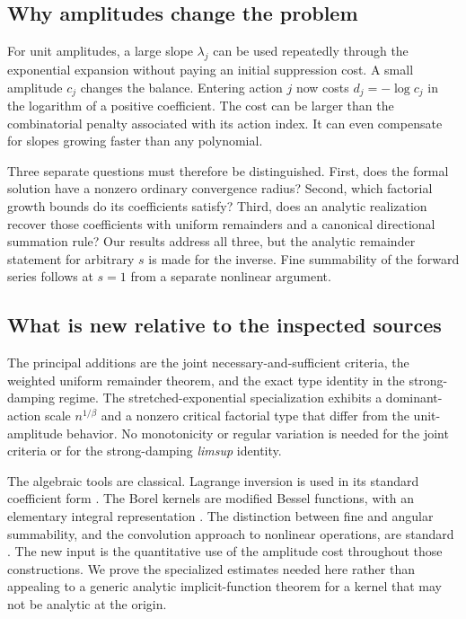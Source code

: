 \documentclass[11pt,a4paper]{article}
\numberwithin{equation}{section}
\theoremstyle{definition}
\theoremstyle{remark}
\theoremstyle{definition}
\begin{document}
\subsection{Why amplitudes change the problem}
For unit amplitudes, a large slope $\lambda_j$ can be used repeatedly
through the exponential expansion without paying an initial suppression
cost. A small amplitude $c_j$ changes the balance. Entering action $j$
now costs $d_j=-\log c_j$ in the logarithm of a positive coefficient.
The cost can be larger than the combinatorial penalty associated with
its action index. It can even compensate for slopes growing faster than
any polynomial.

Three separate questions must therefore be distinguished. First, does the
formal solution have a nonzero ordinary convergence radius? Second, which
factorial growth bounds do its coefficients satisfy? Third, does an
analytic realization recover those coefficients with uniform remainders
and a canonical directional summation rule? Our results address all
three, but the analytic remainder statement for arbitrary $s$ is made
for the inverse. Fine summability of the forward series follows at
$s=1$ from a separate nonlinear argument.

\subsection{What is new relative to the inspected sources}
The principal additions are the joint necessary-and-sufficient criteria,
the weighted uniform remainder theorem, and the exact type identity in
the strong-damping regime. The stretched-exponential specialization
exhibits a dominant-action scale $n^{1/\beta}$ and a nonzero critical
factorial type that differ from the unit-amplitude behavior. No
monotonicity or regular variation is needed for the joint criteria or
for the strong-damping \emph{limsup} identity.

The algebraic tools are classical. Lagrange inversion is used in its
standard coefficient form \cite{gessel}. The Borel kernels are modified
Bessel functions, with an elementary integral representation
\cite{dlmf}. The distinction between fine and angular summability, and
the convolution approach to nonlinear operations, are standard
\cite{sauzin}. The new input is the quantitative use of the amplitude
cost throughout those constructions. We prove the specialized estimates
needed here rather than appealing to a generic analytic implicit-function
theorem for a kernel that may not be analytic at the origin.
\end{document}
